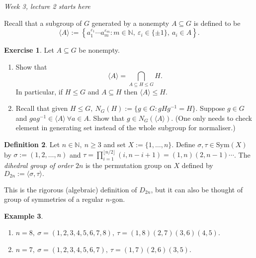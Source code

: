 \documentclass[a4paper]{article}
\newcommand{\Sym}{\text{Sym}}
\theoremstyle{definition}
\newtheorem{defn}{Definition}[subsection]
\newtheorem{example}[defn]{Example}
\newtheorem{exe}[defn]{Exercise}
\begin{document}
\begin{flushright}
\textit{Week 3, lecture 2 starts here}
\end{flushright}
Recall that a subgroup of $G$ generated by a nonempty $A\subseteq G$ is defined to be
\[
\langle A\rangle :=\left\{ a_1^{\varepsilon_1}\cdots a_m^{\varepsilon_m}:m\in\mathbb N,\ \varepsilon_i\in\{\pm 1\},\ a_i\in A \right\}.
\]
\begin{exe}
Let $A\subseteq G$ be nonempty.
\begin{enumerate}
\item Show that
\[
\langle A\rangle = \bigcap_{A\subseteq H\leq G} H.
\]
In particular, if $H\leq G$ and $A\subseteq H$ then $\langle A\rangle\leq H$.
\item Recall that given $H\leq G,\ N_G(H):=\{g\in G:gHg^{-1}=H\}$. Suppose $g\in G$ and $gag^{-1}\in\langle A\rangle \ \forall a\in A$. Show that $g\in N_G(\langle A\rangle).$ (One only needs to check element in generating set instead of the whole subgroup for normaliser.)
\end{enumerate}
\end{exe}
\begin{defn}
Let $n\in\mathbb N,\ n\geq 3$ and set $X:=\{1,\ldots,n\}$. Define $\sigma,\tau\in\Sym(X)$ by $\sigma:=(1,2,\ldots,n)$ and $\tau=\prod_{i=1}^{\lfloor n/2\rfloor} (i,n-i+1)=(1,n)(2,n-1)\cdots$. The \textit{dihedral group of order} $2n$ is the permutation group on $X$ defined by $D_{2n}:=\langle\sigma,\tau\rangle.$
\end{defn}
This is the rigorous (algebraic) definition of $D_{2n}$, but it can also be thought of group of symmetries of a regular $n$-gon.
\begin{example}
\begin{enumerate}
\item $n=8,\ \sigma=(1,2,3,4,5,6,7,8),\ \tau=(1,8)(2,7)(3,6)(4,5)$.
\item $n=7,\ \sigma=(1,2,3,4,5,6,7),\ \tau=(1,7)(2,6)(3,5)$.
\end{enumerate}
\end{example}
\end{document}
